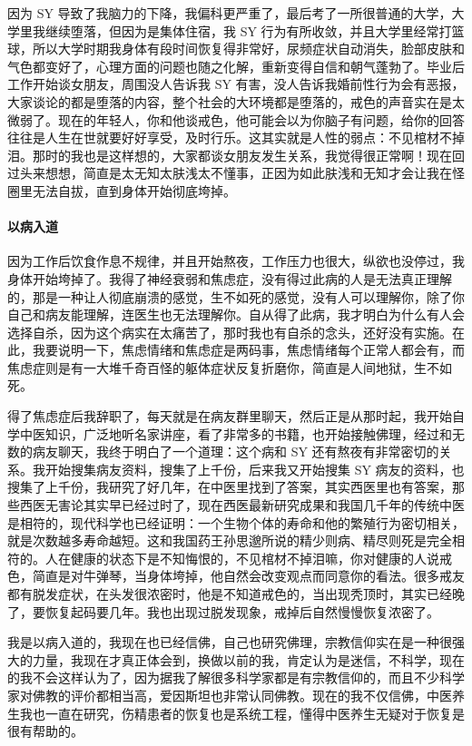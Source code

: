 \documentclass[fontset=founder]{ctexart}
\begin{document}
因为 SY 导致了我脑力的下降，我偏科更严重了，最后考了一所很普通的大学，大学里我继续堕落，但因为是集体住宿，我 SY 行为有所收敛，并且大学里经常打篮球，所以大学时期我身体有段时间恢复得非常好，尿频症状自动消失，脸部皮肤和气色都变好了，心理方面的问题也随之化解，重新变得自信和朝气蓬勃了。毕业后工作开始谈女朋友，周围没人告诉我 SY 有害，没人告诉我婚前性行为会有恶报，大家谈论的都是堕落的内容，整个社会的大环境都是堕落的，戒色的声音实在是太微弱了。现在的年轻人，你和他谈戒色，他可能会以为你脑子有问题，给你的回答往往是人生在世就要好好享受，及时行乐。这其实就是人性的弱点：不见棺材不掉泪。那时的我也是这样想的，大家都谈女朋友发生关系，我觉得很正常啊！现在回过头来想想，简直是太无知太肤浅太不懂事，正因为如此肤浅和无知才会让我在怪圈里无法自拔，直到身体开始彻底垮掉。

\paragraph{以病入道}

因为工作后饮食作息不规律，并且开始熬夜，工作压力也很大，纵欲也没停过，我身体开始垮掉了。我得了神经衰弱和焦虑症，没有得过此病的人是无法真正理解的，那是一种让人彻底崩溃的感觉，生不如死的感觉，没有人可以理解你，除了你自己和病友能理解，连医生也无法理解你。自从得了此病，我才明白为什么有人会选择自杀，因为这个病实在太痛苦了，那时我也有自杀的念头，还好没有实施。在此，我要说明一下，焦虑情绪和焦虑症是两码事，焦虑情绪每个正常人都会有，而焦虑症则是有一大堆千奇百怪的躯体症状反复折磨你，简直是人间地狱，生不如死。

得了焦虑症后我辞职了，每天就是在病友群里聊天，然后正是从那时起，我开始自学中医知识，广泛地听名家讲座，看了非常多的书籍，也开始接触佛理，经过和无数的病友聊天，我终于明白了一个道理：这个病和 SY 还有熬夜有非常密切的关系。我开始搜集病友资料，搜集了上千份，后来我又开始搜集 SY 病友的资料，也搜集了上千份，我研究了好几年，在中医里找到了答案，其实西医里也有答案，那些西医无害论其实早已经过时了，现在西医最新研究成果和我国几千年的传统中医是相符的，现代科学也已经证明：一个生物个体的寿命和他的繁殖行为密切相关，就是次数越多寿命越短。这和我国药王孙思邈所说的精少则病、精尽则死是完全相符的。人在健康的状态下是不知悔恨的，不见棺材不掉泪嘛，你对健康的人说戒色，简直是对牛弹琴，当身体垮掉，他自然会改变观点而同意你的看法。很多戒友都有脱发症状，在头发很浓密时，他是不知道戒色的，当出现秃顶时，其实已经晚了，要恢复起码要几年。我也出现过脱发现象，戒掉后自然慢慢恢复浓密了。

我是以病入道的，我现在也已经信佛，自己也研究佛理，宗教信仰实在是一种很强大的力量，我现在才真正体会到，换做以前的我，肯定认为是迷信，不科学，现在的我不会这样认为了，因为据我了解很多科学家都是有宗教信仰的，而且不少科学家对佛教的评价都相当高，爱因斯坦也非常认同佛教。现在的我不仅信佛，中医养生我也一直在研究，伤精患者的恢复也是系统工程，懂得中医养生无疑对于恢复是很有帮助的。
\end{document}
